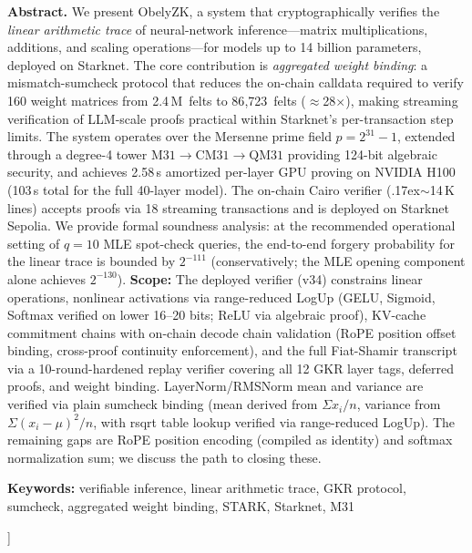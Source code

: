 \documentclass[10pt,twocolumn]{article}
\theoremstyle{definition}
\theoremstyle{remark}
\newcommand{\M}{\mathrm{M31}}
\newcommand{\CM}{\mathrm{CM31}}
\newcommand{\QM}{\mathrm{QM31}}
\begin{document}
\begin{@twocolumnfalse}
\begin{center}
  \begin{minipage}{0.92\textwidth}
    \small\textbf{Abstract.}
    We present ObelyZK, a system that cryptographically verifies the
    \emph{linear arithmetic trace} of neural-network inference---matrix
    multiplications, additions, and scaling operations---for models up
    to 14 billion parameters, deployed on Starknet.
    The core contribution is \emph{aggregated weight binding}: a
    mismatch-sumcheck protocol that reduces the on-chain calldata
    required to verify 160 weight matrices from 2.4\,M~felts to
    86{,}723~felts ($\approx$28$\times$), making streaming
    verification of LLM-scale proofs practical within Starknet's
    per-transaction step limits.
    The system operates over the Mersenne prime field
    $p = 2^{31}-1$, extended through a degree-4 tower
    $\M \to \CM \to \QM$ providing 124-bit algebraic security,
    and achieves 2.58\,s amortized per-layer GPU proving on NVIDIA H100
    (103\,s total for the full 40-layer model).
    The on-chain Cairo verifier ({\raise.17ex\hbox{$\scriptstyle\sim$}}14\,K
    lines) accepts proofs via 18 streaming transactions and is
    deployed on Starknet Sepolia.
    We provide formal soundness analysis: at the recommended
    operational setting of $q=10$ MLE spot-check queries,
    the end-to-end forgery probability for the linear trace
    is bounded by $2^{-111}$ (conservatively; the MLE opening
    component alone achieves $2^{-130}$).
    \textbf{Scope:} The deployed verifier (v34) constrains
    linear operations, nonlinear activations
    via range-reduced LogUp (GELU, Sigmoid, Softmax verified
    on lower 16--20 bits; ReLU via algebraic proof),
    KV-cache commitment chains with on-chain decode chain
    validation (RoPE position offset binding, cross-proof
    continuity enforcement), and
    the full Fiat-Shamir transcript via a 10-round-hardened
    replay verifier covering all 12 GKR layer tags,
    deferred proofs, and weight binding.
    LayerNorm/RMSNorm mean and variance are verified via
    plain sumcheck binding (mean derived from $\Sigma x_i / n$,
    variance from $\Sigma (x_i - \mu)^2 / n$, with rsqrt
    table lookup verified via range-reduced LogUp).
    The remaining gaps are RoPE position encoding (compiled
    as identity) and softmax normalization sum; we discuss
    the path to closing these.
  \end{minipage}

  \vspace{8pt}
  {\scriptsize\textbf{Keywords:}
    verifiable inference, linear arithmetic trace, GKR protocol,
    sumcheck, aggregated weight binding, STARK, Starknet, M31}

  \vspace{10pt}
\end{center}
\end{@twocolumnfalse}
]
\makeatother
\end{document}
